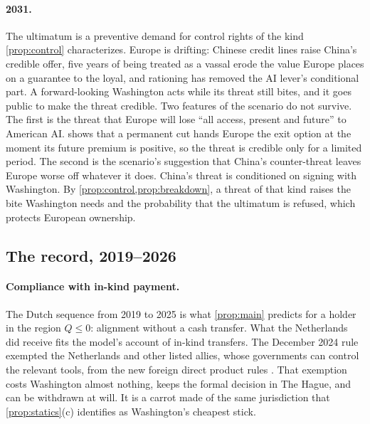 \paragraph{2031.} The ultimatum is a preventive demand for control rights of the kind \cref{prop:control} characterizes. Europe is drifting: Chinese credit lines raise China's credible offer, five years of being treated as a vassal erode the value Europe places on a guarantee to the loyal, and rationing has removed the AI lever's conditional part. A forward-looking Washington acts while its threat still bites, and it goes public to make the threat credible. Two features of the scenario do not survive. The first is the threat that Europe will lose ``all access, present and future'' to American AI.  shows that a permanent cut hands Europe the exit option at the moment its future premium is positive, so the threat is credible only for a limited period. The second is the scenario's suggestion that China's counter-threat leaves Europe worse off whatever it does. China's threat is conditioned on signing with Washington. By \cref{prop:control,prop:breakdown}, a threat of that kind raises the bite Washington needs and the probability that the ultimatum is refused, which protects European ownership.

\subsection{The record, 2019--2026}

\paragraph{Compliance with in-kind payment.} The Dutch sequence from 2019 to 2025 is what \cref{prop:main} predicts for a holder in the region $Q\leq 0$: alignment without a cash transfer. What the Netherlands did receive fits the model's account of in-kind transfers. The December 2024 rule exempted the Netherlands and other listed allies, whose governments can control the relevant tools, from the new foreign direct product rules \citep{bis2024fdpr}. That exemption costs Washington almost nothing, keeps the formal decision in The Hague, and can be withdrawn at will. It is a carrot made of the same jurisdiction that \cref{prop:statics}(c) identifies as Washington's cheapest stick.

